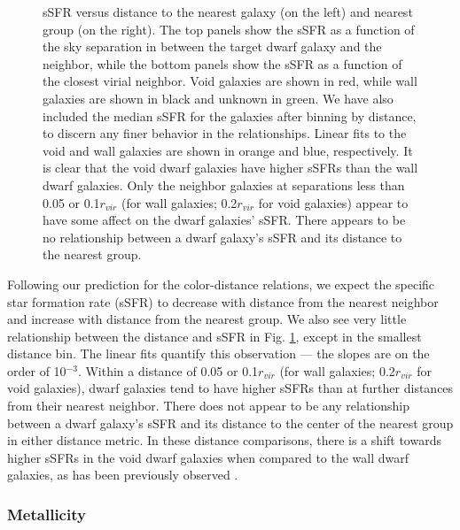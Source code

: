 \begin{figure}
    \caption[sSFR versus distance to nearest neighbor and group]{sSFR versus 
    distance to the nearest galaxy (on the left) and nearest group (on the 
    right).  The top panels show the sSFR as a function of the sky separation in 
    \hMpc between the target dwarf galaxy and the neighbor, while the bottom 
    panels show the sSFR as a function of the closest virial neighbor.  Void 
    galaxies are shown in red, while wall galaxies are shown in black and 
    unknown in green.  We have also included the median sSFR for the galaxies 
    after binning by distance, to discern any finer behavior in the 
    relationships.  Linear fits to the void and wall galaxies are shown in 
    orange and blue, respectively.  It is clear that the void dwarf galaxies 
    have higher sSFRs than the wall dwarf galaxies.  Only the neighbor galaxies 
    at separations less than 0.05 \hMpc or 0.1$r_{vir}$ (for wall galaxies; 
    0.2$r_{vir}$ for void galaxies) appear to have some affect on the dwarf 
    galaxies' sSFR.  There appears to be no relationship between a dwarf 
    galaxy's sSFR and its distance to the nearest group.}
    \label{fig:sSFR}
\end{figure}

Following our prediction for the color-distance relations, we expect the 
specific star formation rate (sSFR) to decrease with distance from the nearest 
neighbor and increase with distance from the nearest group.  We also see very 
little relationship between the distance and sSFR in Fig. \ref{fig:sSFR}, except 
in the smallest distance bin.  The linear fits quantify this observation --- the 
slopes are on the order of 10$^{-3}$.  Within a distance of 0.05 \hMpc or 
0.1$r_{vir}$ (for wall galaxies; 0.2$r_{vir}$ for void galaxies), dwarf galaxies 
tend to have higher sSFRs than at further distances from their nearest neighbor.  
There does not appear to be any relationship between a dwarf galaxy's sSFR and 
its distance to the center of the nearest group in either distance metric.  In 
these distance comparisons, there is a shift towards higher sSFRs in the void 
dwarf galaxies when compared to the wall dwarf galaxies, as has been previously 
observed \citep{Rojas05,vonBendaBeckmann08,Moorman15,Beygu16}.  


\subsubsection{Metallicity}

